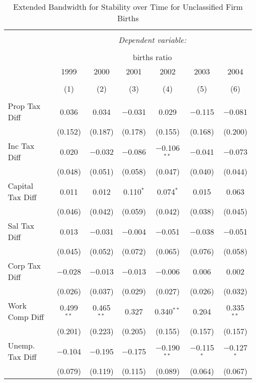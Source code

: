 
\begin{table}[!htbp] \centering 
  \caption{Extended Bandwidth for Stability over Time for  Unclassified Firm Births} 
  \label{99 ebyear} 
\small 
\begin{tabular}{@{\extracolsep{5pt}}lcccccc} 
\\[-1.8ex]\hline 
\hline \\[-1.8ex] 
 & \multicolumn{6}{c}{\textit{Dependent variable:}} \\ 
\cline{2-7} 
\\[-1.8ex] & \multicolumn{6}{c}{births ratio} \\ 
 & 1999 & 2000 & 2001 & 2002 & 2003 & 2004 \\ 
\\[-1.8ex] & (1) & (2) & (3) & (4) & (5) & (6)\\ 
\hline \\[-1.8ex] 
 Prop Tax Diff & 0.036 & 0.034 & $-$0.031 & 0.029 & $-$0.115 & $-$0.081 \\ 
  & (0.152) & (0.187) & (0.178) & (0.155) & (0.168) & (0.200) \\ 
  Inc Tax Diff & 0.020 & $-$0.032 & $-$0.086 & $-$0.106$^{**}$ & $-$0.041 & $-$0.073 \\ 
  & (0.048) & (0.051) & (0.058) & (0.047) & (0.040) & (0.044) \\ 
  Capital Tax Diff & 0.011 & 0.012 & 0.110$^{*}$ & 0.074$^{*}$ & 0.015 & 0.063 \\ 
  & (0.046) & (0.042) & (0.059) & (0.042) & (0.038) & (0.045) \\ 
  Sal Tax Diff & 0.013 & $-$0.031 & $-$0.004 & $-$0.051 & $-$0.038 & $-$0.051 \\ 
  & (0.045) & (0.052) & (0.072) & (0.065) & (0.076) & (0.058) \\ 
  Corp Tax Diff & $-$0.028 & $-$0.013 & $-$0.013 & $-$0.006 & 0.006 & 0.002 \\ 
  & (0.026) & (0.037) & (0.029) & (0.027) & (0.026) & (0.032) \\ 
  Work Comp Diff & 0.499$^{**}$ & 0.465$^{**}$ & 0.327 & 0.340$^{**}$ & 0.204 & 0.335$^{**}$ \\ 
  & (0.201) & (0.223) & (0.205) & (0.155) & (0.157) & (0.157) \\ 
  Unemp. Tax Diff & $-$0.104 & $-$0.195 & $-$0.175 & $-$0.190$^{**}$ & $-$0.115$^{*}$ & $-$0.127$^{*}$ \\ 
  & (0.079) & (0.119) & (0.115) & (0.089) & (0.064) & (0.067) \\ 

\end{tabular}
\end{table}
